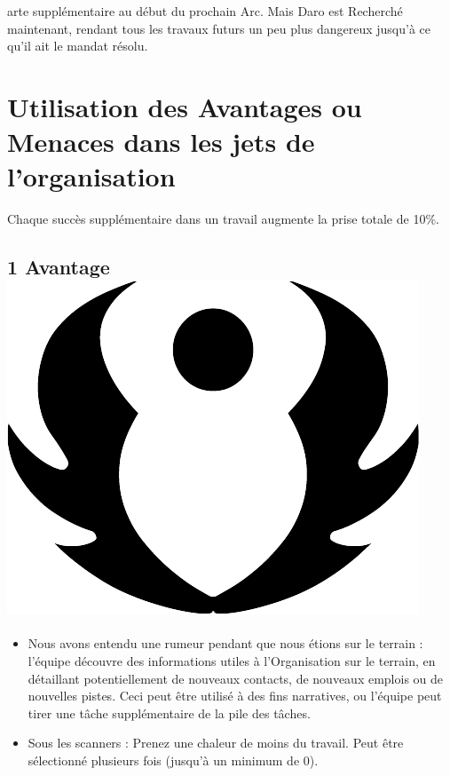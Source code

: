 \documentclass{article}
\begin{document}
arte supplémentaire au début du prochain Arc. Mais Daro est Recherché maintenant, rendant tous les travaux futurs un peu plus dangereux jusqu'à ce qu'il ait le mandat résolu.

\section*{Utilisation des Avantages ou Menaces dans les jets de l’organisation}
Chaque succès supplémentaire dans un travail augmente la prise totale de 10\%.

\subsection*{1 Avantage \includegraphics[height=\fontcharht\font`\B]{../_img/result_avantage_advantage}}
\begin{itemize}
	\item Nous avons entendu une rumeur pendant que nous étions sur le terrain : l'équipe découvre des informations utiles à l'Organisation sur le terrain, en détaillant potentiellement de nouveaux contacts, de nouveaux emplois ou de nouvelles pistes. Ceci peut être utilisé à des fins narratives, ou l'équipe peut tirer une tâche supplémentaire de la pile des tâches.
	\item Sous les scanners : Prenez une chaleur de moins du travail. Peut être sélectionné plusieurs fois (jusqu'à un minimum de 0).
\end{itemize}
\end{document}
